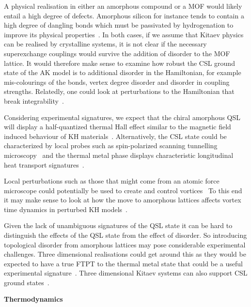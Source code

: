 A physical realisation in either an amorphous compound or a MOF would likely entail a high degree of defects. Amorphous silicon for instance tends to contain a high degree of dangling bonds which must be passivated by hydrogenation to improve its physical properties~\autocite{streetHydrogenatedAmorphousSilicon1991}. In both cases, if we assume that Kitaev physics can be realised by crystalline systems, it is not clear if the necessary superexchange couplings would survive the addition of disorder to the MOF lattice. It would therefore make sense to examine how robust the CSL ground state of the AK model is to additional disorder in the Hamiltonian, for example mis-colourings of the bonds, vertex degree disorder and disorder in coupling strengths. Relatedly, one could look at perturbations to the Hamiltonian that break integrability~\autocite{Rau2014,Chaloupka2010,Chaloupka2013,Chaloupka2015,Winter2016}.

Considering experimental signatures, we expect that the chiral amorphous QSL will display a half-quantized thermal Hall effect similar to the magnetic field induced behaviour of KH materials~\autocite{Kasahara2018,Yokoi2021,Yamashita2020,Bruin2022}. Alternatively, the CSL state could be characterized by local probes such as spin-polarized scanning tunnelling microscopy~\autocite{Feldmeier2020,Konig2020,Udagawa2021} and the thermal metal phase displays characteristic longitudinal heat transport signatures~\autocite{Beenakker2013}.

Local perturbations such as those that might come from an atomic force microscope could potentially be used to create and control vortices~\autocite{jangVortexCreationControl2021} To this end it may make sense to look at how the move to amorphous lattices affects vortex time dynamics in perturbed KH models~\autocite{joyDynamicsVisonsThermal2022}.

Given the lack of unambiguous signatures of the QSL state it can be hard to distinguish the effects of the QSL state from the effect of disorder. So introducing topological disorder from amorphous lattices may pose considerable experimental challenges. Three dimensional realisations could get around this as they would be expected to have a true FTPT to the thermal metal state that could be a useful experimental signature~\autocite{eschmannThermodynamicClassificationThreedimensional2020,OBrienPRB2016}. Three dimensional Kitaev systems can also support CSL ground states~\autocite{mishchenkoChiralSpinLiquids2020}.

\textbf{Thermodynamics}

